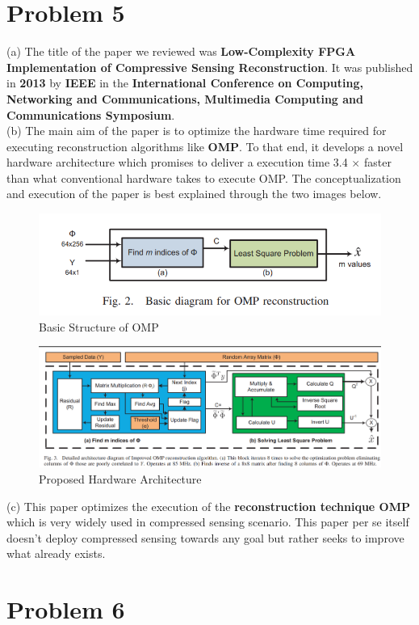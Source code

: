 \documentclass[a4paper,11pt]{article}
\numberwithin{definition}{section}
\numberwithin{mytheorem}{subsection}
\begin{document}
\section{Problem 5}
(a) The title of the paper we reviewed was \textbf{Low-Complexity FPGA Implementation of
Compressive Sensing Reconstruction}. It was published in \textbf{2013} by \textbf{IEEE} in the \textbf{International Conference on Computing, Networking and Communications, Multimedia Computing and Communications
Symposium}.\\
(b) The main aim of the paper is to optimize the hardware time required for executing reconstruction algorithms like \textbf{OMP}. To that end, it develops a novel hardware architecture which promises to deliver a execution time 3.4 $\times$ faster than what conventional hardware takes to execute OMP. The conceptualization and execution of the paper is best explained through the two images below.\\
\begin{figure}
    \begin{center}
        \includegraphics[scale=0.5]{Basic Structure of OMP.png}
        \caption{Basic Structure of OMP}
    \end{center}
\end{figure}

\begin{figure}
    \begin{center}
        \includegraphics[scale=0.5]{Proposed HArdware Architecture.png}
        \caption{Proposed Hardware Architecture}
    \end{center}
\end{figure}
(c) This paper optimizes the execution of the \textbf{reconstruction technique OMP} which is very widely used in compressed sensing scenario. This paper per se itself doesn't deploy compressed sensing towards any goal but rather seeks to improve what already exists. 
\section{Problem 6}
\end{document}
